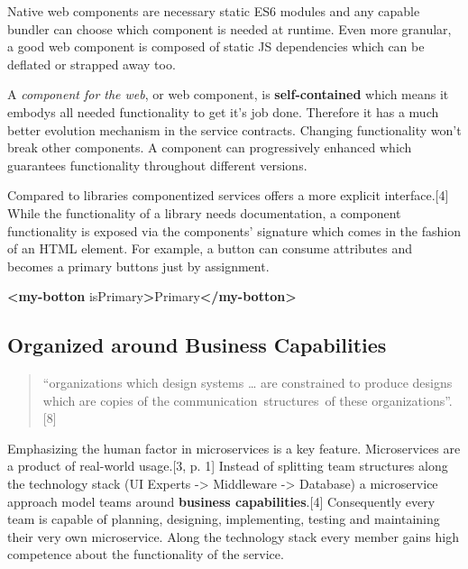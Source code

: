 \documentclass[]{article}
\newenvironment{Shaded}{}{}
\newcommand{\KeywordTok}[1]{\textcolor[rgb]{0.00,0.44,0.13}{\textbf{{#1}}}}
\newcommand{\OtherTok}[1]{\textcolor[rgb]{0.00,0.44,0.13}{{#1}}}
\newcommand{\NormalTok}[1]{{#1}}
\begin{document}
Native web components are necessary static ES6 modules and any capable
bundler can choose which component is needed at runtime. Even more
granular, a good web component is composed of static JS dependencies
which can be deflated or strapped away too.

A \emph{component for the web}, or web component, is
\textbf{self-contained} which means it embodys all needed functionality
to get it's job done. Therefore it has a much better evolution mechanism
in the service contracts. Changing functionality won't break other
components. A component can progressively enhanced which guarantees
functionality throughout different versions.

Compared to libraries componentized services offers a more explicit
interface.{[}4{]} While the functionality of a library needs
documentation, a component functionality is exposed via the components'
signature which comes in the fashion of an HTML element. For example, a
button can consume attributes and becomes a primary buttons just by
assignment.

\begin{Shaded}
\begin{Highlighting}[]
\KeywordTok{<my-botton}\OtherTok{ isPrimary}\KeywordTok{>}\NormalTok{Primary}\KeywordTok{</my-botton>}
\end{Highlighting}
\end{Shaded}

\subsection{Organized around Business
Capabilities}\label{organized-around-business-capabilities}

\begin{quote}
``organizations which design systems \ldots{} are constrained to produce
designs which are copies of the communication~structures~of these
organizations''. {[}8{]}
\end{quote}

Emphasizing the human factor in microservices is a key feature.
Microservices are a product of real-world usage.{[}3, p. 1{]} Instead of
splitting team structures along the technology stack (UI Experts
-\textgreater{} Middleware -\textgreater{} Database) a microservice
approach model teams around \textbf{business capabilities}.{[}4{]}
Consequently every team is capable of planning, designing, implementing,
testing and maintaining their very own microservice. Along the
technology stack every member gains high competence about the
functionality of the service.
\end{document}
